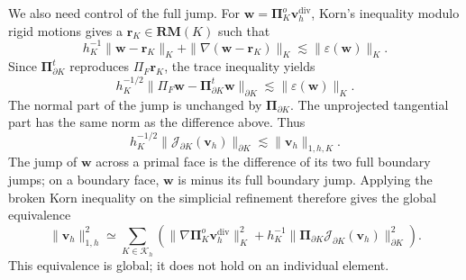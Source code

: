 \documentclass[review,hidelinks,onefignum,onetabnum]{siamart251216}
\newcommand{\AI}[1]{{\color{blue}#1}}
\begin{document}
\AI{We also need control of the full jump. For
$\boldsymbol w=\boldsymbol\Pi_K^o\boldsymbol v_h^{\operatorname{div}}$,
Korn's inequality modulo rigid motions gives a $\boldsymbol r_K\in\mathbf{RM}(K)$
such that
\[
h_K^{-1}\|\boldsymbol w-\boldsymbol r_K\|_K
+\|\nabla(\boldsymbol w-\boldsymbol r_K)\|_K
\lesssim\|\varepsilon(\boldsymbol w)\|_K.
\]
Since $\boldsymbol\Pi_{\partial K}^t$ reproduces $\Pi_F\boldsymbol r_K$,
the trace inequality yields
\[
h_K^{-1/2}\|\Pi_F\boldsymbol w-
\boldsymbol\Pi_{\partial K}^t\boldsymbol w\|_{\partial K}
\lesssim\|\varepsilon(\boldsymbol w)\|_K.
\]
The normal part of the jump is unchanged by $\boldsymbol\Pi_{\partial K}$.
The unprojected tangential part has the same norm as the difference above. Thus
\begin{equation}\label{eq:fulljump}
h_K^{-1/2}\|\mathcal J_{\partial K}(\boldsymbol v_h)\|_{\partial K}
\lesssim\|\boldsymbol v_h\|_{1,h,K}.
\end{equation}
The jump of $\boldsymbol w$ across a primal face is the difference of its
two full boundary jumps; on a boundary face, $\boldsymbol w$ is minus its
full boundary jump. Applying the broken Korn inequality \cite{Brenner2004}
on the simplicial refinement therefore gives the global equivalence
\begin{equation}\label{eq:globalKorn}
\|\boldsymbol v_h\|_{1,h}^2\simeq
\sum_{K\in\mathcal K_h}\left(
\|\nabla\boldsymbol\Pi_K^o\boldsymbol v_h^{\operatorname{div}}\|_K^2
+h_K^{-1}\|\boldsymbol\Pi_{\partial K}\mathcal J_{\partial K}(\boldsymbol v_h)\|_{\partial K}^2
\right).
\end{equation}
This equivalence is global; it does not hold on an individual element.}
\end{document}
